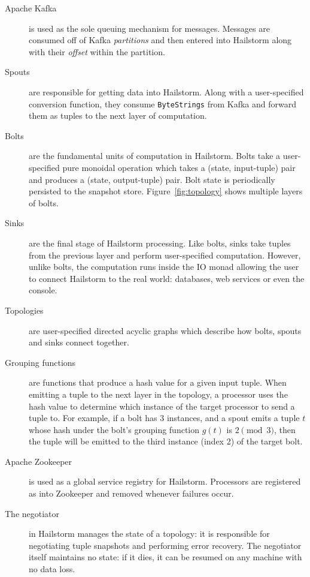\documentclass[10pt,nocopyrightspace]{sigplanconf}
\begin{document}
\begin{description}
\item[Apache Kafka] is used as the sole queuing mechanism for
  messages. Messages are consumed off of Kafka \textit{partitions} and then
  entered into Hailstorm along with their \textit{offset} within the
  partition.

\item[Spouts] are responsible for getting data into Hailstorm. Along
  with a user-specified conversion function, they consume \lstinline{ByteStrings}
  from Kafka and forward them as tuples to the next layer of computation.

\item[Bolts] are the fundamental units of computation in Hailstorm.
  Bolts take a user-specified pure monoidal operation which takes a (state, input-tuple)
  pair and produces a (state, output-tuple) pair. Bolt state is periodically
  persisted to the snapshot store. Figure~\ref{fig:topology} shows multiple
  layers of bolts.

\item[Sinks] are the final stage of Hailstorm processing. Like bolts,
  sinks take tuples from the previous layer and perform user-specified computation.
  However, unlike bolts, the computation runs inside the IO monad allowing the
  user to connect Hailstorm to the real world: databases, web services or even the
  console.

\item[Topologies] are user-specified directed acyclic graphs which
  describe how bolts, spouts and sinks connect together.

\item[Grouping functions] are functions that produce a hash value for a
given input tuple. When emitting a tuple to the next layer in the topology, a
processor uses the hash value to determine which instance of the target
processor to send a tuple to. For example, if a bolt has 3 instances, and a
spout emits a tuple $t$ whose hash under the bolt's grouping function $g(t)$ is
$2 \pmod 3$, then the tuple will be emitted to the third instance (index 2) of
the target bolt.

\item[Apache Zookeeper] is used as a global service registry for
  Hailstorm. Processors are registered as into Zookeeper and removed whenever
  failures occur.

\item[The negotiator] in Hailstorm manages the state of a topology: it is
  responsible for negotiating tuple snapshots and performing error recovery. The
  negotiator itself maintains no state: if it dies, it can be resumed on any
  machine with no data loss.
\end{description}
\end{document}
